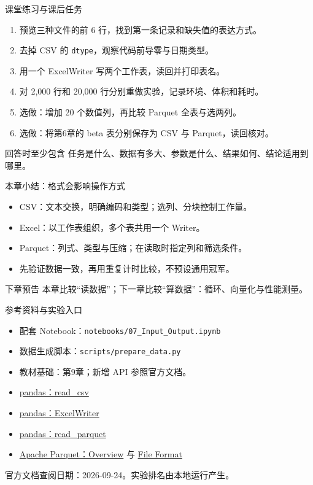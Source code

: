 \documentclass[9pt]{ctexbeamer}
\begin{document}
\begin{frame}{课堂练习与课后任务}
\begin{enumerate}
\item 预览三种文件的前 6 行，找到第一条记录和缺失值的表达方式。
\item 去掉 CSV 的 \texttt{dtype}，观察代码前导零与日期类型。
\item 用一个 ExcelWriter 写两个工作表，读回并打印表名。
\item 对 2,000 行和 20,000 行分别重做实验，记录环境、体积和耗时。
\item 选做：增加 20 个数值列，再比较 Parquet 全表与选两列。
\item 选做：将第6章的 beta 表分别保存为 CSV 与 Parquet，读回核对。
\end{enumerate}
\begin{block}{回答时至少包含}
任务是什么、数据有多大、参数是什么、结果如何、结论适用到哪里。
\end{block}
\end{frame}

\begin{frame}{本章小结：格式会影响操作方式}
\begin{itemize}
\item CSV：文本交换，明确编码和类型；选列、分块控制工作量。
\item Excel：以工作表组织，多个表共用一个 Writer。
\item Parquet：列式、类型与压缩；在读取时指定列和筛选条件。
\item 先验证数据一致，再用重复计时比较，不预设通用冠军。
\end{itemize}
\begin{exampleblock}{下章预告}
本章比较“读数据”；下一章比较“算数据”：循环、向量化与性能测量。
\end{exampleblock}
\end{frame}

\begin{frame}{参考资料与实验入口}
\small
\begin{itemize}
\item 配套 Notebook：\texttt{notebooks/07\_Input\_Output.ipynb}
\item 数据生成脚本：\texttt{scripts/prepare\_data.py}
\item 教材基础：第9章\citep{hilpisch2018python}；新增 API 参照官方文档。
\item \href{https://pandas.pydata.org/docs/reference/api/pandas.read_csv.html}{pandas：read\_csv}
\item \href{https://pandas.pydata.org/docs/reference/api/pandas.ExcelWriter.html}{pandas：ExcelWriter}
\item \href{https://pandas.pydata.org/docs/reference/api/pandas.read_parquet.html}{pandas：read\_parquet}
\item \href{https://parquet.apache.org/docs/overview/}{Apache Parquet：Overview} 与
\href{https://parquet.apache.org/docs/file-format/}{File Format}
\end{itemize}
官方文档查阅日期：2026-09-24。实验排名由本地运行产生。
\end{frame}
\end{document}
